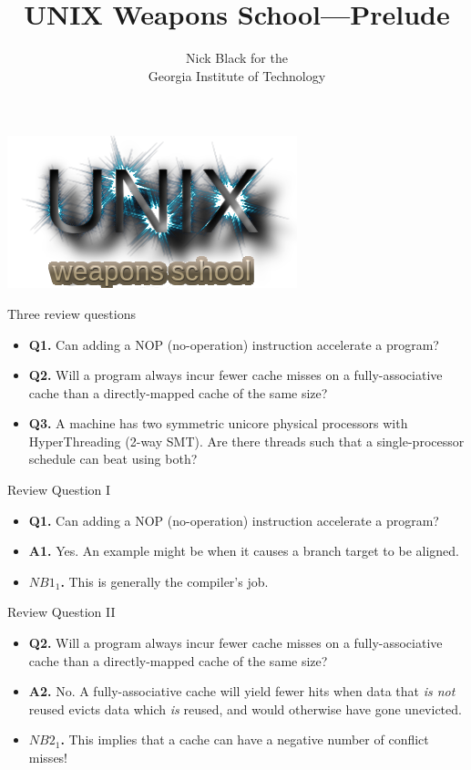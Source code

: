 \documentclass[handout]{beamer}
\title{UNIX Weapons School---Prelude}
\date{}
\author{Nick Black for the\\
Georgia Institute of Technology
}
\begin{document}
\begin{frame}
\titlepage
\begin{center}
\includegraphics[scale=0.33]{uws.png}
\end{center}
\end{frame}

\begin{frame}{Three review questions}
\begin{itemize}
\item \textbf{Q1.} Can adding a NOP (no-operation) instruction accelerate a program?
\item \textbf{Q2.} Will a program always incur fewer cache misses on a fully-associative
	cache than a directly-mapped cache of the same size?
\item \textbf{Q3.} A machine has two symmetric unicore physical processors with HyperThreading
	(2-way SMT). Are there threads such that a single-processor
	schedule can beat using both?
\end{itemize}
\end{frame}

\begin{frame}{Review Question I}
\begin{itemize}
\item \textbf{Q1.} Can adding a NOP (no-operation) instruction accelerate a program?
\item \textbf{A1.} Yes. An example might be when it causes a branch target to 
 be aligned.
\item \textbf{$NB1_1$.} This is generally the compiler's job.
\end{itemize}
\end{frame}

\begin{frame}{Review Question II}
\begin{itemize}
\item \textbf{Q2.} Will a program always incur fewer cache misses on a fully-associative
	cache than a directly-mapped cache of the same size?
\item \textbf{A2.} No. A fully-associative cache will yield fewer hits when
  data that \textit{is not} reused evicts data which \textit{is} reused, and
  would otherwise have gone unevicted.
\item \textbf{$NB2_1$.} This implies that a cache can have a
  negative number of conflict misses!
\end{itemize}
\end{frame}
\end{document}
